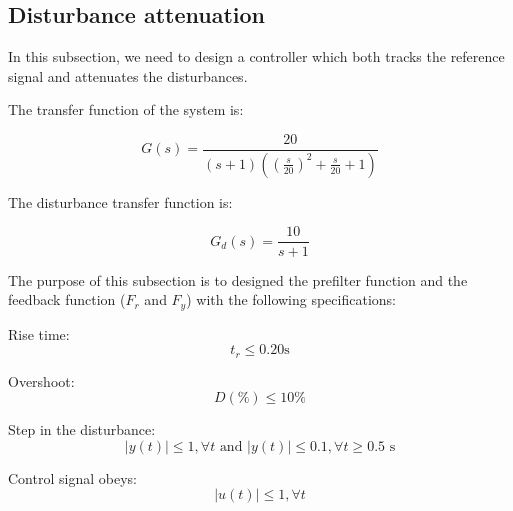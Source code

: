 \subsection{Disturbance attenuation}

In this subsection, we need to design a controller which both tracks the reference signal and attenuates the disturbances.

The transfer function of the system is:

$$G(s) = \frac{20}{(s+1)((\frac{s}{20})^2+\frac{s}{20}+1)}$$

The disturbance transfer function is:

$$G_d(s) = \frac{10}{s+1}$$

The purpose of this subsection is to designed the prefilter function and the feedback function ($F_r$ and $F_y$) with the following specifications:

\begin{shortitemize}
    \item Rise time:
        $$t_r \leq 0.20\text{s}$$
    \item Overshoot:
        $$D(\%) \leq 10\%$$
    \item Step in the disturbance:
        $$|y(t)| \leq 1, \forall t \text{ and } |y(t)| \leq 0.1, \forall t \geq 0.5\text{ s}$$ 
    \item Control signal obeys:
        $$|u(t)| \leq 1, \forall t$$
\end{shortitemize}





